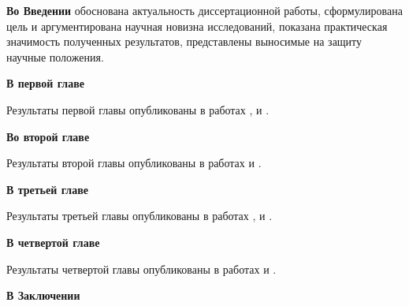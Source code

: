 \documentclass[candidate, href, colorlinks]{disser}
\begin{document}
\textbf{Во Введении} обоснована актуальность диссертационной работы, сформулирована цель и аргументирована научная новизна исследований, показана практическая значимость полученных результатов, представлены выносимые на защиту научные положения.

\textbf{В первой главе}

Результаты первой главы опубликованы в работах \cite{AlfimovLebedev}, \cite{NizhniNovgorod2014} и \cite{Ufa2015}.

\textbf{Во второй главе}

Результаты второй главы опубликованы в работах \cite{Bannoe2019} и \cite{Bannoe2021}.

\textbf{В третьей главе}

Результаты третьей главы опубликованы в работах \cite{LebedevAlfimovMalomed}, \cite{NizhniNovgorod2016} и \cite{Tashkent2018}.

\textbf{В четвертой главе}

Результаты четвертой главы опубликованы в работах \cite{AlfimovGegelLebedevMalomedZezyulin} и \cite{Bannoe2018}.

\textbf{В Заключении}

\renewcommand{\bibname}{\protect\leftline{Bibliography}}

\renewcommand{\bibname}{\protect\leftline{\large Список публикаций автора по теме диссертации}}
\printbibliography[keyword=own]


\end{document}
